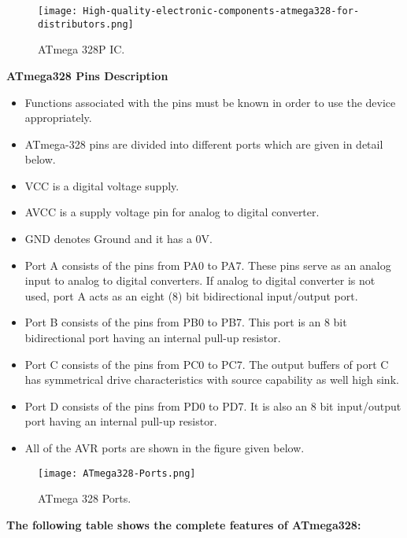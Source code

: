 \begin{figure}[h]
	\centering
	\texttt{[image: High-quality-electronic-components-atmega328-for-distributors.png]}
	\caption{ATmega 328P IC.}
\end{figure}

\textbf{ATmega328 Pins Description}
\begin{itemize}
	\item Functions associated with the pins must be known in order to use the device appropriately.
	\item ATmega-328 pins are divided into different ports which are given in detail below.
	\item VCC is a digital voltage supply.
	\item AVCC is a supply voltage pin for analog to digital converter.
	\item GND denotes Ground and it has a 0V.
	\item Port A consists of the pins from PA0 to PA7. These pins serve as an analog input to analog to digital converters. If analog to digital converter is not used, port A acts as an eight (8) bit bidirectional input/output port.
	\item Port B consists of the pins from PB0 to PB7. This port is an 8 bit bidirectional port having an internal pull-up resistor.
	\item Port C consists of the pins from PC0 to PC7. The output buffers of port C has symmetrical drive characteristics with source capability as well high sink.
	\item Port D consists of the pins from PD0 to PD7. It is also an 8 bit input/output port having an internal pull-up resistor.
	\item All of the AVR ports are shown in the figure given below.
\end{itemize}
\begin{figure}[h]
	\centering
	\texttt{[image: ATmega328-Ports.png]}
	\caption{ATmega 328 Ports.}
\end{figure}
\textbf{The following table shows the complete features of ATmega328:}

